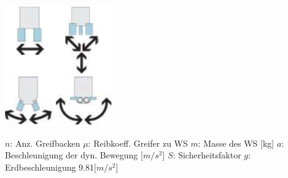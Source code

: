 \begin{minipage}{0.5\linewidth}
    \begin{minipage}{0.3\linewidth}
    \includegraphics[width=\linewidth]{./bilder/GreiferAusfurung}
    \end{minipage}
    \begin{minipage}{0.7\linewidth}
    $n$: Anz. Greifbacken\newline
    $\mu$: Reibkoeff. Greifer zu WS\newline
    $m$: Masse des WS [kg]\newline
    $a$: Beschleunigung der dyn. Bewegung [$m/s^2$]\newline
    $S$: Sicherheitsfaktor\newline
    $g$: Erdbeschleunigung 9.81[$m/s^2$]
    \end{minipage}
\end{minipage}


